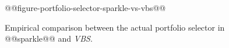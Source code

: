 \documentclass[british]{article}
\begin{document}
\begin{figure}[htbp]
\noindent \begin{centering}
@@figure-portfolio-selector-sparkle-vs-vbs@@
\par\end{centering}

\caption{Empirical comparison between the actual portfolio selector in @@sparkle@@ and \emph{VBS}.}\label{fig:sparkle_vs_vbs}
\end{figure}
\fi




\end{document}
